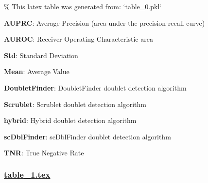 \documentclass[11pt]{article}
\begin{document}
\begin{codeoutput}
\% This latex table was generated from: `table\_0.pkl`
\begin{table}[h]
\caption{Descriptive statistics of AUPRC, AUROC and TNR metrics stratified by doublet detection algorithm}
\label{table:descriptive\_stats}
\begin{threeparttable}
\renewcommand{\TPTminimum}{\linewidth}
\begin{tablenotes}
\footnotesize
\item \textbf{AUPRC}: Average Precision (area under the precision-recall curve)
\item \textbf{AUROC}: Receiver Operating Characteristic area
\item \textbf{Std}: Standard Deviation
\item \textbf{Mean}: Average Value
\item \textbf{DoubletFinder}: DoubletFinder doublet detection algorithm
\item \textbf{Scrublet}: Scrublet doublet detection algorithm
\item \textbf{hybrid}: Hybrid doublet detection algorithm
\item \textbf{scDblFinder}: scDblFinder doublet detection algorithm
\item \textbf{TNR}: True Negative Rate
\end{tablenotes}
\end{threeparttable}
\end{table}
\end{codeoutput}

\subsubsection*{\hyperlink{code-LaTeX Table Design-table-1-tex}{table\_1.tex}}
\end{document}
